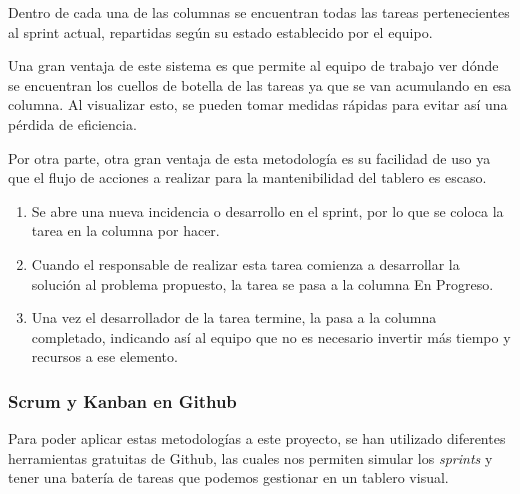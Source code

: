 Dentro de cada una de las columnas se encuentran todas las tareas pertenecientes al sprint actual, repartidas según su estado establecido por el equipo.

Una gran ventaja de este sistema es que permite al equipo de trabajo ver dónde se encuentran los cuellos de botella de las tareas ya que se van acumulando en esa columna. Al visualizar esto, se pueden tomar medidas rápidas para evitar así una pérdida de eficiencia.

Por otra parte, otra gran ventaja de esta metodología es su facilidad de uso ya que el flujo de acciones a realizar para la mantenibilidad del tablero es escaso.
\begin{enumerate}
    \item Se abre una nueva incidencia o desarrollo en el sprint, por lo que se coloca la tarea en la columna por hacer.
    \item Cuando el responsable de realizar esta tarea comienza a desarrollar la solución al problema propuesto, la tarea se pasa a la columna En Progreso.
    \item Una vez el desarrollador de la tarea termine, la pasa a la columna completado, indicando así al equipo que no es necesario invertir más tiempo y recursos a ese elemento.
\end{enumerate}


\subsubsection{Scrum y Kanban en Github}

Para poder aplicar estas metodologías a este proyecto, se han utilizado diferentes herramientas gratuitas de Github, las cuales nos permiten simular los \textit{sprints} y tener una batería de tareas que podemos gestionar en un tablero visual. 

